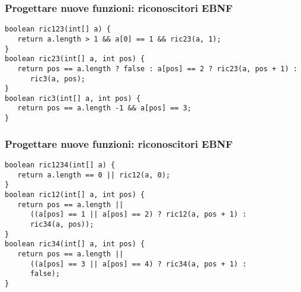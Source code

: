 \documentclass{beamer}
\begin{document}
\begin{frame}[fragile]
\frametitle{Progettare nuove funzioni: riconoscitori EBNF}
\begin{verbatim}
boolean ric123(int[] a) {
   return a.length > 1 && a[0] == 1 && ric23(a, 1);
}
boolean ric23(int[] a, int pos) {
   return pos == a.length ? false : a[pos] == 2 ? ric23(a, pos + 1) :
      ric3(a, pos);
}
boolean ric3(int[] a, int pos) {
   return pos == a.length -1 && a[pos] == 3;
}
\end{verbatim}
\end{frame}

\begin{frame}[fragile]
\frametitle{Progettare nuove funzioni: riconoscitori EBNF}
\begin{verbatim}
boolean ric1234(int[] a) {
   return a.length == 0 || ric12(a, 0);
}
boolean ric12(int[] a, int pos) {
   return pos == a.length ||
      ((a[pos] == 1 || a[pos] == 2) ? ric12(a, pos + 1) :
      ric34(a, pos));
}
boolean ric34(int[] a, int pos) {
   return pos == a.length ||
      ((a[pos] == 3 || a[pos] == 4) ? ric34(a, pos + 1) :
      false);
}
\end{verbatim}
\end{frame}

% 
% 
\end{document}

